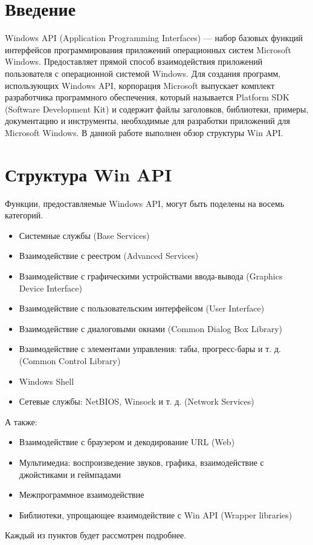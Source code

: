 


    

    


    \section{Введение}
    Windows API (Application Programming Interfaces) — набор базовых функций интерфейсов программирования приложений операционных систем Microsoft Windows. Предоставляет прямой способ взаимодействия приложений пользователя с операционной системой Windows. Для создания программ, использующих Windows API, корпорация Microsoft выпускает комплект разработчика программного обеспечения, который называется Platform SDK (Software Development Kit) и содержит файлы заголовков, библиотеки, примеры, документацию и инструменты, необходимые для разработки приложений для Microsoft Windows. В данной работе выполнен обзор структуры Win API.

    \section{Структура Win API}
    Функции, предоставляемые Windows API, могут быть поделены на восемь категорий.
    \begin{itemize}
        \item Системные службы (Base Services)
        \item Взаимодействие с реестром (Advanced Services)
        \item Взаимодействие с графическими устройствами ввода-вывода (Graphics Device Interface)
        \item Взаимодействие с пользовательским интерфейсом (User Interface)
        \item Взаимодействие с диалоговыми окнами (Common Dialog Box Library)
        \item Взаимодействие с элементами управления: табы, прогресс-бары и т. д. (Common Control Library)
        \item Windows Shell
        \item Сетевые службы: NetBIOS, Winsock и т. д. (Network Services)
    \end{itemize}

    А также:
    \begin{itemize}
        \item Взаимодействие с браузером и декодирование URL (Web)
        \item Мультимедиа: воспроизведение звуков, графика, взаимодействие с джойстиками и геймпадами
        \item Межпрограммное взаимодействие
        \item Библиотеки, упрощающее взаимодействие с Win API (Wrapper libraries)
    \end{itemize}
    Каждый из пунктов будет рассмотрен подробнее.

